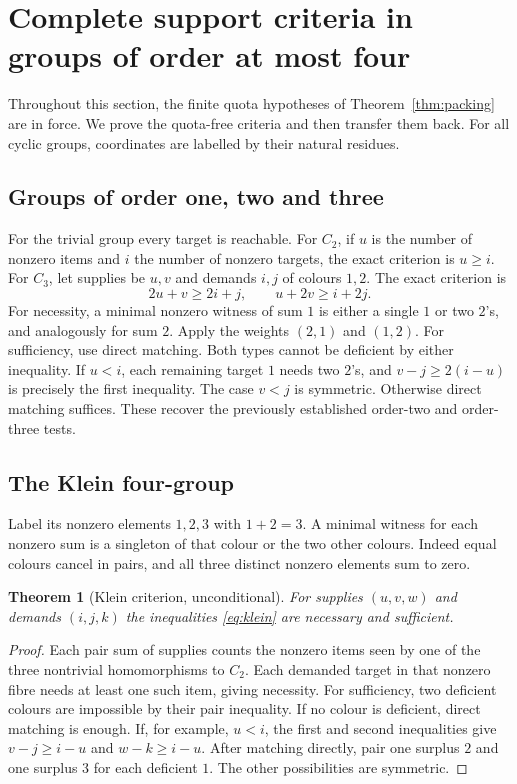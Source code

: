 \documentclass[11pt]{article}
\newtheorem{theorem}{Theorem}[section]
\theoremstyle{remark}\newtheorem{remark}[theorem]{Remark}
\begin{document}
\section{Complete support criteria in groups of order at most four}\label{sec:tests}
Throughout this section, the finite quota hypotheses of Theorem~\ref{thm:packing} are in force. We prove the quota-free criteria and then transfer them back. For all cyclic groups, coordinates are labelled by their natural residues.

\subsection{Groups of order one, two and three}
For the trivial group every target is reachable. For $C_2$, if $u$ is the number of nonzero items and $i$ the number of nonzero targets, the exact criterion is $u\ge i$. For $C_3$, let supplies be $u,v$ and demands $i,j$ of colours $1,2$. The exact criterion is
\begin{equation}\label{eq:c3}
 2u+v\ge2i+j,\qquad u+2v\ge i+2j.
\end{equation}
For necessity, a minimal nonzero witness of sum $1$ is either a single $1$ or two $2$'s, and analogously for sum $2$. Apply the weights $(2,1)$ and $(1,2)$. For sufficiency, use direct matching. Both types cannot be deficient by either inequality. If $u<i$, each remaining target $1$ needs two $2$'s, and $v-j\ge2(i-u)$ is precisely the first inequality. The case $v<j$ is symmetric. Otherwise direct matching suffices. These recover the previously established order-two and order-three tests.

\subsection{The Klein four-group}
Label its nonzero elements $1,2,3$ with $1+2=3$. A minimal witness for each nonzero sum is a singleton of that colour or the two other colours. Indeed equal colours cancel in pairs, and all three distinct nonzero elements sum to zero.

\begin{theorem}[Klein criterion, unconditional]\label{thm:klein}
For supplies $(u,v,w)$ and demands $(i,j,k)$ the inequalities \eqref{eq:klein} are necessary and sufficient.
\end{theorem}
\begin{proof}
Each pair sum of supplies counts the nonzero items seen by one of the three nontrivial homomorphisms to $C_2$. Each demanded target in that nonzero fibre needs at least one such item, giving necessity. For sufficiency, two deficient colours are impossible by their pair inequality. If no colour is deficient, direct matching is enough. If, for example, $u<i$, the first and second inequalities give $v-j\ge i-u$ and $w-k\ge i-u$. After matching directly, pair one surplus $2$ and one surplus $3$ for each deficient $1$. The other possibilities are symmetric.
\end{proof}
\end{document}
